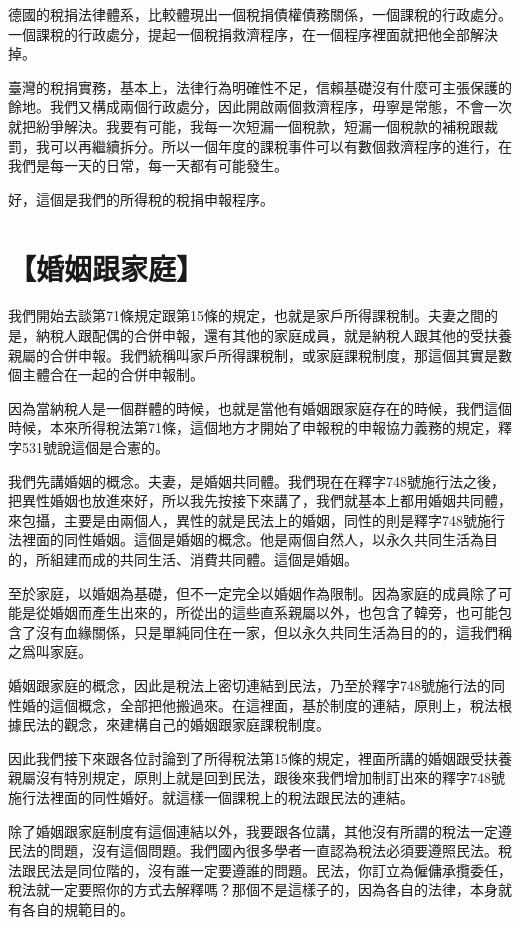 \documentclass[oneside,sub3section]{ctexbook}
\begin{document}
德國的稅捐法律體系，比較體現出一個稅捐債權債務關係，一個課稅的行政處分。一個課稅的行政處分，提起一個稅捐救濟程序，在一個程序裡面就把他全部解決掉。

臺灣的稅捐實務，基本上，法律行為明確性不足，信賴基礎沒有什麼可主張保護的餘地。我們又構成兩個行政處分，因此開啟兩個救濟程序，毋寧是常態，不會一次就把紛爭解決。我要有可能，我每一次短漏一個稅款，短漏一個稅款的補稅跟裁罰，我可以再繼續拆分。所以一個年度的課稅事件可以有數個救濟程序的進行，在我們是每一天的日常，每一天都有可能發生。

好，這個是我們的所得稅的稅捐申報程序。

\hypertarget{ux5a5aux59fbux8ddfux5bb6ux5ead}{%
\section{【婚姻跟家庭】}\label{ux5a5aux59fbux8ddfux5bb6ux5ead}}

我們開始去談第71條規定跟第15條的規定，也就是家戶所得課稅制。夫妻之間的是，納稅人跟配偶的合併申報，還有其他的家庭成員，就是納稅人跟其他的受扶養親屬的合併申報。我們統稱叫家戶所得課稅制，或家庭課稅制度，那這個其實是數個主體合在一起的合併申報制。

因為當納稅人是一個群體的時候，也就是當他有婚姻跟家庭存在的時候，我們這個時候，本來所得稅法第71條，這個地方才開始了申報稅的申報協力義務的規定，釋字531號說這個是合憲的。

我們先講婚姻的概念。夫妻，是婚姻共同體。我們現在在釋字748號施行法之後，把異性婚姻也放進來好，所以我先按接下來講了，我們就基本上都用婚姻共同體，來包攝，主要是由兩個人，異性的就是民法上的婚姻，同性的則是釋字748號施行法裡面的同性婚姻。這個是婚姻的概念。他是兩個自然人，以永久共同生活為目的，所組建而成的共同生活、消費共同體。這個是婚姻。

至於家庭，以婚姻為基礎，但不一定完全以婚姻作為限制。因為家庭的成員除了可能是從婚姻而產生出來的，所從出的這些直系親屬以外，也包含了韓旁，也可能包含了沒有血緣關係，只是單純同住在一家，但以永久共同生活為目的的，這我們稱之爲叫家庭。

婚姻跟家庭的概念，因此是稅法上密切連結到民法，乃至於釋字748號施行法的同性婚的這個概念，全部把他搬過來。在這裡面，基於制度的連結，原則上，稅法根據民法的觀念，來建構自己的婚姻跟家庭課稅制度。

因此我們接下來跟各位討論到了所得稅法第15條的規定，裡面所講的婚姻跟受扶養親屬沒有特別規定，原則上就是回到民法，跟後來我們增加制訂出來的釋字748號施行法裡面的同性婚好。就這樣一個課稅上的稅法跟民法的連結。

除了婚姻跟家庭制度有這個連結以外，我要跟各位講，其他沒有所謂的稅法一定遵民法的問題，沒有這個問題。我們國內很多學者一直認為稅法必須要遵照民法。稅法跟民法是同位階的，沒有誰一定要遵誰的問題。民法，你訂立為僱傭承攬委任，稅法就一定要照你的方式去解釋嗎？那個不是這樣子的，因為各自的法律，本身就有各自的規範目的。
\end{document}
